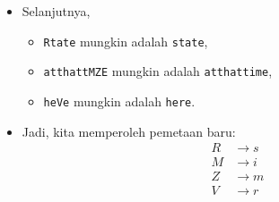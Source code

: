 \documentclass{article}
\begin{document}

\begin{itemize}
    \item Selanjutnya,
    \begin{itemize}
        \item \texttt{Rtate} mungkin adalah \texttt{state},
        \item \texttt{atthattMZE} mungkin adalah \texttt{atthattime},
        \item \texttt{heVe} mungkin adalah \texttt{here}.
    \end{itemize}
    \item Jadi, kita memperoleh pemetaan baru:
    \[
    \begin{aligned}
    R & \rightarrow s \\
    M & \rightarrow i \\
    Z & \rightarrow m \\
    V & \rightarrow r
    \end{aligned}
    \]
\end{itemize}
\end{document}
